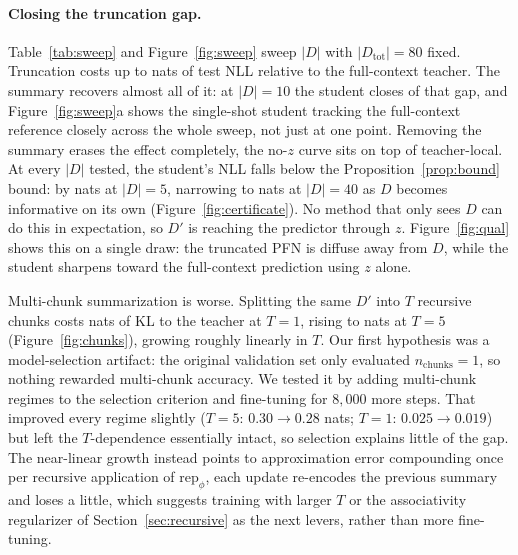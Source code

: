\documentclass[11pt]{article}
\newcommand{\Dtot}{D_{\mathrm{tot}}}
\newcommand{\Dfar}{D'}
\newcommand{\Dloc}{D}
\newcommand{\rep}{\mathrm{rep}}
\begin{document}
\paragraph{Closing the truncation gap.} Table~\ref{tab:sweep} and
Figure~\ref{fig:sweep} sweep $|\Dloc|$ with $|\Dtot|=80$ fixed. Truncation
costs up to \truncgapmax{} nats of test NLL relative to the full-context
teacher. The summary recovers almost all of it: at $|\Dloc|=10$ the
student closes \shortclosepct{} of that gap, and Figure~\ref{fig:sweep}a
shows the single-shot student tracking the full-context reference closely
across the whole sweep, not just at one point. Removing the summary erases
the effect completely, the no-$z$ curve sits on top of teacher-local.
At every $|\Dloc|$ tested, the student's NLL falls below
the Proposition~\ref{prop:bound} bound: by \certmarginmax{} nats at
$|\Dloc|=5$, narrowing to \certmarginmin{} nats at $|\Dloc|=40$ as $\Dloc$
becomes informative on its own (Figure~\ref{fig:certificate}). No method
that only sees $\Dloc$ can do this in expectation, so $\Dfar$ is reaching
the predictor through $z$. Figure~\ref{fig:qual} shows this on a single
draw: the truncated PFN is diffuse away from $\Dloc$, while the student
sharpens toward the full-context prediction using $z$ alone.

Multi-chunk summarization is worse. Splitting the same $\Dfar$ into $T$
recursive chunks costs \chunkonekl{} nats of KL to the teacher at $T=1$,
rising to \chunkfivekl{} nats at $T=5$ (Figure~\ref{fig:chunks}), growing
roughly linearly in $T$. Our first hypothesis was a model-selection
artifact: the original validation set only evaluated
$n_{\mathrm{chunks}}=1$, so nothing rewarded multi-chunk accuracy. We
tested it by adding multi-chunk regimes to the selection criterion and
fine-tuning for $8{,}000$ more steps. That improved every regime slightly
($T=5$: $0.30 \to 0.28$ nats; $T=1$: $0.025 \to 0.019$) but left the
$T$-dependence essentially intact, so selection explains little of the
gap. The near-linear growth instead points to approximation error
compounding once per recursive application of $\rep_\phi$, each update
re-encodes the previous summary and loses a little, which suggests
training with larger $T$ or the associativity regularizer of
Section~\ref{sec:recursive} as the next levers, rather than more
fine-tuning.

\begin{table}[t]
\centering
\caption{Predictive quality vs.\ size of the direct context $\Dloc$, with
$|\Dtot| = 80$ fixed and $\Dfar$ the remainder ($3{,}200$ prior data sets,
$40$ query points each). Left block: NLL of held-out targets (nats, lower is
better). Right block: KL from the full-context teacher (nats/point).}
\label{tab:sweep}
\resizebox{\textwidth}{!}{}
\end{table}
\end{document}
